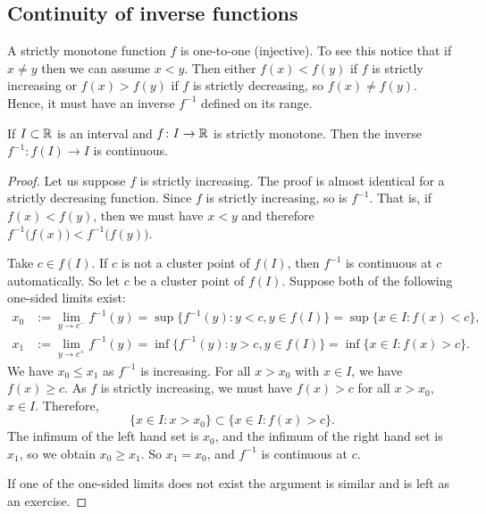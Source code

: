 \subsection{Continuity of inverse functions}


A strictly monotone function $f$ is one-to-one (injective).  To see this
notice that if $x \not= y$ then we can assume $x < y$.  Then either $f(x) <
f(y)$ if $f$ is strictly increasing or $f(x) > f(y)$ if $f$ is strictly
decreasing, so $f(x) \not= f(y)$.
Hence, it
must have an inverse $f^{-1}$ defined on its range.

\begin{prop} \label{prop:invcont}
If $I \subset {\mathbb{R}}$ is an interval and $f \colon I \to {\mathbb{R}}$ is strictly
monotone.  Then the inverse $f^{-1} \colon f(I) \to I$ is continuous.
\end{prop}

\begin{proof}
Let us suppose $f$ is strictly increasing.  The proof is almost
identical for a strictly decreasing function.
Since $f$ is strictly increasing, so is $f^{-1}$.  That is, if $f(x) <
f(y)$, then we must have $x < y$ and therefore
$f^{-1}\bigl(f(x)\bigr) < f^{-1}\bigl(f(y)\bigr)$.

Take $c \in f(I)$.
If $c$ is not a cluster point of $f(I)$, then $f^{-1}$ is continuous at $c$
automatically.  So let $c$ be a cluster point of $f(I)$.
Suppose both of the following one-sided limits exist:
\begin{align*}
x_0 & := \lim_{y \to c^-} f^{-1}(y) =
\sup \{ f^{-1}(y) : y < c, y \in f(I) \}
=
\sup \{ x \in I : f(x) < c \} , \\
x_1 & := \lim_{y \to c^+} f^{-1}(y) =
\inf \{ f^{-1}(y) : y > c, y \in f(I) \}
=
\inf \{ x \in I : f(x) > c \} .
\end{align*}
We have $x_0 \leq x_1$ as $f^{-1}$ is increasing.
For all $x > x_0$ with $x \in I$, we have $f(x) \geq c$.  As $f$ is strictly increasing,
we must have $f(x) > c$ for all $x > x_0$, $x \in I$.  Therefore,
\begin{equation*}
\{ x \in I : x > x_0 \} \subset \{ x \in I : f(x) > c \}.
\end{equation*}
The infimum of the left hand set is $x_0$, and the infimum of the right hand
set is $x_1$, so we obtain $x_0 \geq x_1$.
So $x_1 = x_0$, and $f^{-1}$ is continuous at $c$.

If one of the one-sided limits does not exist the argument is similar
and is left as an exercise.
\end{proof}

